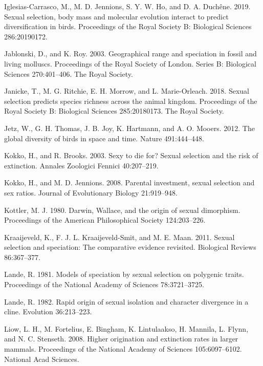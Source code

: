 \documentclass[]{article}
\begin{document}
\leavevmode\hypertarget{ref-Iglesias-Carrasco_2019}{}%
Iglesias-Carrasco, M., M. D. Jennions, S. Y. W. Ho, and D. A. Duchêne.
2019. Sexual selection, body mass and molecular evolution interact to
predict diversification in birds. Proceedings of the Royal Society B:
Biological Sciences 286:20190172.

\leavevmode\hypertarget{ref-Jablonski_2003}{}%
Jablonski, D., and K. Roy. 2003. Geographical range and speciation in
fossil and living molluscs. Proceedings of the Royal Society of London.
Series B: Biological Sciences 270:401--406. The Royal Society.

\leavevmode\hypertarget{ref-Janicke_2018}{}%
Janicke, T., M. G. Ritchie, E. H. Morrow, and L. Marie-Orleach. 2018.
Sexual selection predicts species richness across the animal kingdom.
Proceedings of the Royal Society B: Biological Sciences 285:20180173.
The Royal Society.

\leavevmode\hypertarget{ref-Jetz_2012}{}%
Jetz, W., G. H. Thomas, J. B. Joy, K. Hartmann, and A. O. Mooers. 2012.
The global diversity of birds in space and time. Nature 491:444--448.

\leavevmode\hypertarget{ref-Kokko_Brooks_2003}{}%
Kokko, H., and R. Brooks. 2003. Sexy to die for? Sexual selection and
the risk of extinction. Annales Zoologici Fennici 40:207--219.

\leavevmode\hypertarget{ref-Kokko_Jennions2008}{}%
Kokko, H., and M. D. Jennions. 2008. Parental investment, sexual
selection and sex ratios. Journal of Evolutionary Biology 21:919--948.

\leavevmode\hypertarget{ref-Kottler_1980}{}%
Kottler, M. J. 1980. Darwin, Wallace, and the origin of sexual
dimorphism. Proceedings of the American Philosophical Society
124:203--226.

\leavevmode\hypertarget{ref-Kraaijeveld_2011}{}%
Kraaijeveld, K., F. J. L. Kraaijeveld-Smit, and M. E. Maan. 2011. Sexual
selection and speciation: The comparative evidence revisited. Biological
Reviews 86:367--377.

\leavevmode\hypertarget{ref-Lande_1981}{}%
Lande, R. 1981. Models of speciation by sexual selection on polygenic
traits. Proceedings of the National Academy of Sciences 78:3721--3725.

\leavevmode\hypertarget{ref-Lande_1982}{}%
Lande, R. 1982. Rapid origin of sexual isolation and character
divergence in a cline. Evolution 36:213--223.

\leavevmode\hypertarget{ref-Liow_2008}{}%
Liow, L. H., M. Fortelius, E. Bingham, K. Lintulaakso, H. Mannila, L.
Flynn, and N. C. Stenseth. 2008. Higher origination and extinction rates
in larger mammals. Proceedings of the National Academy of Sciences
105:6097--6102. National Acad Sciences.
\end{document}
